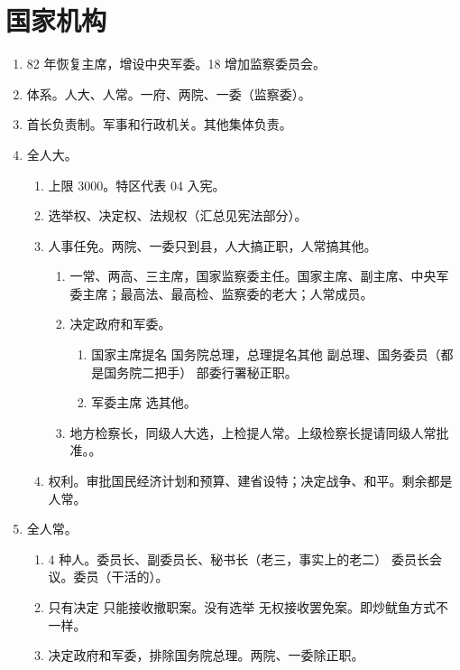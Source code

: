 \section{国家机构}
\begin{enumerate}
  \item 82 年恢复主席，增设中央军委。18 增加监察委员会。
  \item 体系。人大、人常。一府、两院、一委（监察委）。
  \item 首长负责制。军事和行政机关。其他集体负责。
  \item 全人大。
        \begin{enumerate}
          \item 上限 3000。特区代表 04 入宪。
          \item 选举权、决定权、法规权（汇总见宪法部分）。
          \item 人事任免。两院、一委只到县，人大搞正职，人常搞其他。
                \begin{enumerate}
                  \item 一常、两高、三主席，国家监察委主任。国家主席、副主席、中央军委主席；最高法、最高检、监察委的老大；人常成员。
                  \item 决定政府和军委。
                        \begin{enumerate}
                          \item 国家主席提名 \yjt 国务院总理，总理提名其他 \yjt 副总理、国务委员（都是国务院二把手） \yjt 部委行署秘正职。
                          \item 军委主席 \yjt 选其他。
                        \end{enumerate}
                  \item 地方检察长，同级人大选，上检提人常。上级检察长提请同级人常批准。。
                \end{enumerate}
          \item 权利。审批国民经济计划和预算、建省设特；决定战争、和平。剩余都是人常。
        \end{enumerate}
  \item 全人常。
        \begin{enumerate}
          \item 4 种人。委员长、副委员长、秘书长（老三，事实上的老二） \yjt 委员长会议。委员（干活的）。
          \item 只有决定 \yjt 只能接收撤职案。没有选举 \yjt 无权接收罢免案。即炒鱿鱼方式不一样。
          \item 决定政府和军委，排除国务院总理。两院、一委除正职。

\end{enumerate}
\end{enumerate}

